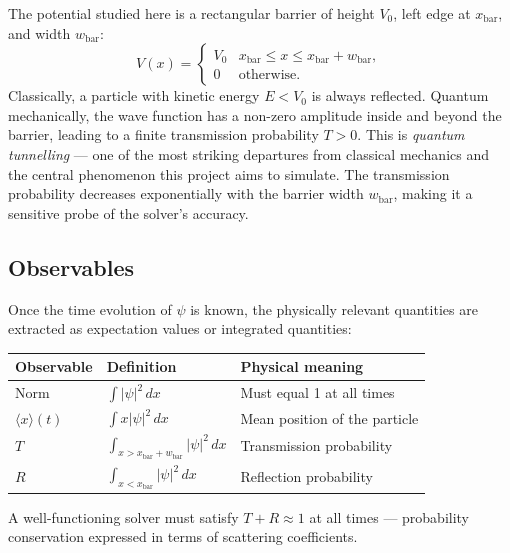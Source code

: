 \documentclass[a4paper,12pt]{article}
\begin{document}
The potential studied here is a rectangular barrier of height $V_0$, left edge
at $x_\mathrm{bar}$, and width $w_\mathrm{bar}$:
\begin{equation}
  V(x) =
  \begin{cases}
    V_0 & x_\mathrm{bar} \le x \le x_\mathrm{bar} + w_\mathrm{bar},\\
    0   & \text{otherwise.}
  \end{cases}
\end{equation}
Classically, a particle with kinetic energy $E < V_0$ is always reflected.
Quantum mechanically, the wave function has a non-zero amplitude inside and
beyond the barrier, leading to a finite transmission probability $T > 0$.
This is \emph{quantum tunnelling} — one of the most striking departures from
classical mechanics and the central phenomenon this project aims to simulate.
The transmission probability decreases exponentially with the barrier width
$w_\mathrm{bar}$, making it a sensitive probe of the solver's accuracy.

\subsection{Observables}

Once the time evolution of $\psi$ is known, the physically relevant quantities
are extracted as expectation values or integrated quantities:

\vskip 2mm
\begin{center}
\begin{tabular}{lll}
  \toprule
  Observable & Definition & Physical meaning \\
  \midrule
  Norm        & $\int|\psi|^2\,dx$                  & Must equal 1 at all times \\
  $\langle x\rangle(t)$ & $\int x|\psi|^2\,dx$     & Mean position of the particle \\
  $T$         & $\int_{x > x_\mathrm{bar}+w_\mathrm{bar}}|\psi|^2\,dx$ & Transmission probability \\
  $R$         & $\int_{x < x_\mathrm{bar}}|\psi|^2\,dx$ & Reflection probability \\
  \bottomrule
\end{tabular}
\end{center}
\vskip 2mm

\noindent
A well-functioning solver must satisfy $T + R \approx 1$ at all times —
probability conservation expressed in terms of scattering coefficients.

\end{document}
